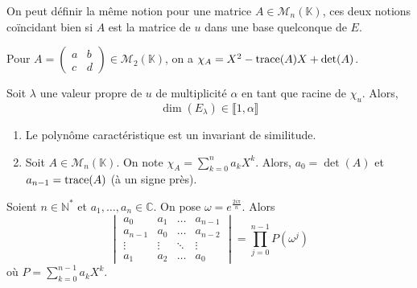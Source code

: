   \begin{remark}
    On peut définir la même notion pour une matrice $A \in \mathcal{M}_n(\mathbb{K})$, ces deux notions coïncidant bien si $A$ est la matrice de $u$ dans une base quelconque de $E$.
  \end{remark}

  \begin{example}
    Pour $A = \begin{pmatrix} a & b \\ c & d \end{pmatrix} \in \mathcal{M}_2(\mathbb{K})$, on a $\chi_A = X^2 - \operatorname{trace}(A)X + \det(A)$.
  \end{example}

  \begin{proposition}
    Soit $\lambda$ une valeur propre de $u$ de multiplicité $\alpha$ en tant que racine de $\chi_u$. Alors,
    \[ \dim(E_\lambda) \in \llbracket 1, \alpha \rrbracket \]
  \end{proposition}


  \begin{proposition}
    \begin{enumerate}[label=(\roman*)]
      \item Le polynôme caractéristique est un invariant de similitude.
      \item Soit $A \in \mathcal{M}_n(\mathbb{K})$. On note $\chi_A = \sum_{k=0}^n a_k X^k$. Alors, $a_0 = \det(A)$ et $a_{n-1} = \operatorname{trace}(A)$ (à un signe près).
    \end{enumerate}
  \end{proposition}


  \begin{lemma}
    \label{suite-de-polygones-1}
    Soient $n \in \mathbb{N}^*$ et $a_1, \dots, a_n \in \mathbb{C}$. On pose $\omega = e^{\frac{2i\pi}{n}}$. Alors
    \[ \begin{vmatrix} a_0 & a_1 & \dots & a_{n-1} \\ a_{n-1} & a_0 & \dots & a_{n-2}\\ \vdots & \vdots & \ddots & \vdots \\ a_1 & a_2 & \dots & a_0 \end{vmatrix} = \prod_{j=0}^{n-1} P(\omega^j) \]
    où $P = \sum_{k=0}^{n-1} a_k X^k$.
  \end{lemma}


